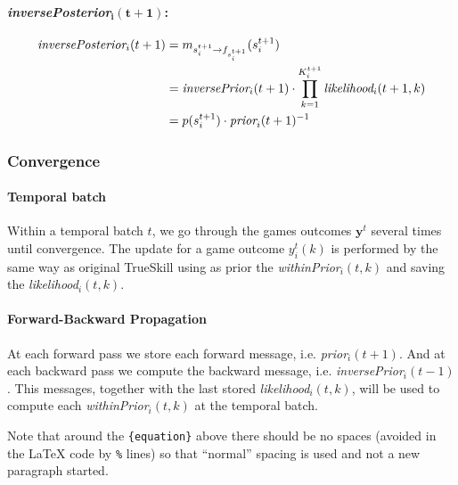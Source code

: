 \documentclass[article]{jss}
\newcommand{\vm}[1]{\mathbf{#1}}
\begin{document}
  \paragraph{\emph{inversePosterior}$\bm{_i(t+1)}$: }
  
 \begin{equation}
 \begin{split}
 \emph{inversePosterior}_i(t+1) &= m_{s_i^{t+1} \rightarrow f_{s_i^{t+1}}}(s_i^{t+1}) \\
 &= \emph{inversePrior}_i(t+1) \cdot \prod_{k=1}^{K_i^{t+1}} \emph{likelihood}_i(t+1,k) \\
 &= p(s_i^{t+1}) \cdot \emph{prior}_i(t+1)^{-1}
 \end{split}
 \end{equation}

\subsubsection{Convergence}

\paragraph{Temporal batch} Within a temporal batch $t$, we go through the games outcomes $\vm{y}^t$ several times until convergence.
The update for a game outcome $y^t_i(k)$ is performed by the same way as original TrueSkill using as prior the \emph{withinPrior}$_i(t,k)$ and saving the \emph{likelihood}$_i(t,k)$.

\paragraph{Forward-Backward Propagation}
At each forward pass we store each forward message, i.e. \emph{prior}$_i(t+1)$.
And at each backward pass we compute the backward message, i.e. \emph{inversePrior}$_i(t-1)$.
This messages, together with the last stored \emph{likelihood}$_i(t,k)$, will be used to compute each \emph{withinPrior}$_i(t,k)$ at the temporal batch.

















\begin{leftbar}
Note that around the \verb|{equation}| above there should be no spaces (avoided
in the {\LaTeX} code by \verb|%| lines) so that ``normal'' spacing is used and
not a new paragraph started.
\end{leftbar}
\end{document}
